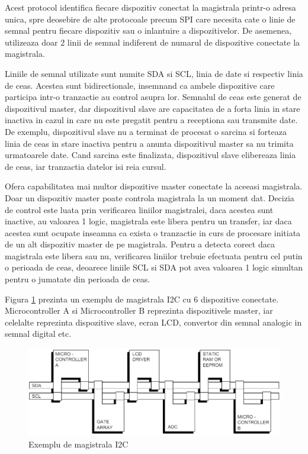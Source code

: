 Acest protocol identifica fiecare dispozitiv conectat la magistrala printr-o adresa unica, spre deosebire de alte protocoale precum SPI care necesita cate o 
linie de semnal pentru fiecare dispozitiv sau o inlantuire a dispozitivelor. De asemenea, utilizeaza doar 2 linii de semnal indiferent de numarul de dispozitive 
conectate la magistrala.

Liniile de semnal utilizate sunt numite SDA si SCL, linia de date si respectiv linia de ceas. Acestea sunt bidirectionale, insemnand ca ambele dispozitive 
care participa intr-o tranzactie au control asupra lor. Semnalul de ceas este generat de dispozitivul master, dar dispozitivul slave are capacitatea de a 
forta linia in stare inactiva in cazul in care nu este pregatit pentru a receptiona sau transmite date. De exemplu, dispozitivul slave nu a terminat de 
procesat o sarcina si forteaza linia de ceas in stare inactiva pentru a anunta dispozitivul master sa nu trimita urmatoarele date. Cand sarcina este finalizata, 
dispozitivul slave elibereaza linia de ceas, iar tranzactia datelor isi reia cursul.

Ofera capabilitatea mai multor dispozitive master conectate la aceeasi magistrala. Doar un dispozitiv master poate controla magistrala la un moment dat. 
Decizia de control este luata prin verificarea liniilor magistralei, daca acestea sunt inactive, au valoarea 1 logic, magistrala este libera pentru un transfer,
iar daca acestea sunt ocupate inseamna ca exista o tranzactie in curs de procesare initiata de un alt dispozitiv master de pe magistrala. Pentru a detecta 
corect daca magistrala este libera sau nu, verificarea liniilor trebuie efectuata pentru cel putin o perioada de ceas, deoarece liniile SCL si SDA pot avea 
valoarea 1 logic simultan pentru o jumatate din perioada de ceas.

Figura \ref{fig:I2CBus} prezinta un exemplu de magistrala I2C cu 6 dispozitive conectate. Microcontroller A si Microcontroller B reprezinta dispozitivele master, 
iar celelalte reprezinta dispozitive slave, ecran LCD, convertor din semnal analogic in semnal digital etc.
\begin{figure}[H]
    \centering
    \includegraphics[scale=0.68]{figs/I2CBus.png}
    \caption{Exemplu de magistrala I2C \cite{i2ctutorial}}
    \label{fig:I2CBus}
\end{figure}

